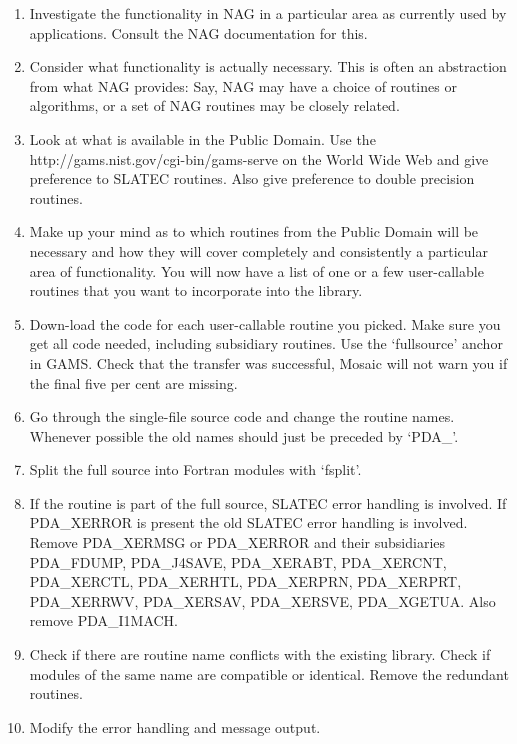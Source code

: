 \documentclass[11pt,twoside,nolof]{starlink}
\begin{document}
\sloppy
\begin{enumerate}
\item
   Investigate the functionality in NAG in a particular area as
   currently used by applications. Consult the NAG documentation for
   this.
\item
   Consider what functionality is actually necessary. This is often an
   abstraction from what NAG provides: Say, NAG may have a choice of
   routines or algorithms, or a set of NAG routines may be closely
   related.
\item
   Look at what is available in the Public Domain. Use the
{http://gams.nist.gov/cgi-bin/gams-serve}
   on the World Wide Web and give preference to SLATEC routines. Also give
   preference to double precision routines.
\item
   Make up your mind as to which routines from the Public Domain will be
   necessary and how they will cover completely and consistently a
   particular area of functionality. You will now have a list of one or
   a few user-callable routines that you want to incorporate into the
   library.
\item
   Down-load the code for each user-callable routine you picked. Make
   sure you get all code needed, including subsidiary routines. Use the
   `fullsource' anchor in GAMS. Check that the transfer was
   successful, Mosaic will not warn you if the final five per cent are
   missing.
\item
   Go through the single-file source code and change the routine names.
   Whenever possible the old names should just be preceded by `PDA\_'.
\item
   Split the full source into Fortran modules with `fsplit'.
\item
   If the routine
   is part of the full source, SLATEC error
   handling is involved. If PDA\_XERROR is present the old SLATEC error
   handling is involved. Remove PDA\_XERMSG or PDA\_XERROR and their
   subsidiaries PDA\_FDUMP, PDA\_J4SAVE, PDA\_XERABT, PDA\_XERCNT,
   PDA\_XERCTL, PDA\_XERHTL, PDA\_XERPRN, PDA\_XERPRT, PDA\_XERRWV,
   PDA\_XERSAV, PDA\_XERSVE, PDA\_XGETUA. Also remove PDA\_I1MACH.
\item
   Check if there are routine name conflicts with the existing library.
   Check if modules of the same name are compatible or identical. Remove
   the redundant routines.
\item
   Modify the error handling and message output.
   \begin{itemize}

\end{itemize}
\end{enumerate}
\end{document}
